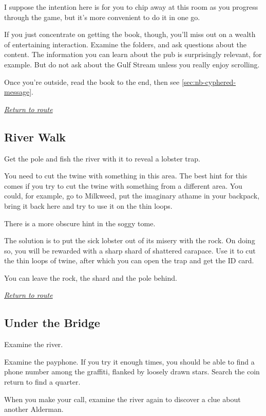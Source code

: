 \documentclass[a5paper]{extarticle}
\begin{document}
I suppose the intention here is for you to chip away at this room as you
progress through the game, but it's more convenient to do it in one go.

If you just concentrate on getting the book, though, you'll miss out on a wealth of
entertaining interaction. Examine the folders, and ask questions about the content.
The information you can learn about the pub is surprisingly relevant,
for example. But do not ask about the Gulf Stream unless you really enjoy scrolling.

Once you're outside, read the book to the end, then see \cref{sec:nb-cyphered-message}.

\hyperref[sec:route-1]{\emph{Return to route}}

\newpage
\subsection{River Walk}\label{sec:sol-River-Walk}

Get the pole and fish the river with it to reveal a lobster trap.

You need to cut the twine with something in this area.
The best hint for this comes if you try to cut the twine with something from a different area.
You could, for example, go to Milkweed, put the imaginary athame in your backpack,
bring it back here and try to use it on the thin loops.

There is a more obscure hint in the soggy tome.

The solution is to put the sick lobster out of its misery with the rock.
On doing so, you will be rewarded with a sharp shard of shattered carapace.
Use it to cut the thin loops of twine,
after which you can open the trap and get the ID card.

You can leave the rock, the shard and the pole behind.

\hyperref[sec:route-1]{\emph{Return to route}}

\newpage
\subsection{Under the Bridge}\label{sec:sol-Under-the-Bridge-0}

Examine the river.

Examine the payphone.
If you try it enough times, you should be able to find a phone number among the graffiti,
flanked by loosely drawn stars.
Search the coin return to find a quarter.

When you make your call, examine the river again to discover a clue about another Alderman.
\end{document}
